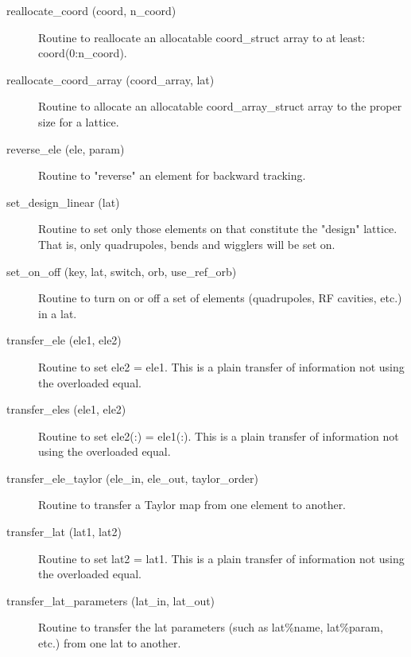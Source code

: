 \begin{description}
\label{r:reallocate.coord}
\item[reallocate_coord (coord, n_coord)] \Newline 
Routine to reallocate an allocatable  coord_struct array to at least:
coord(0:n_coord).

\label{r:reallocate.coord.array}
\item[reallocate_coord_array (coord_array, lat)] \Newline 
Routine to allocate an allocatable coord_array_struct array to
the proper size for a lattice.

\label{r:reverse.ele}
\item[reverse_ele (ele, param)] \Newline
Routine to "reverse" an element for backward tracking. 

\label{r:set.design.linear}
\item[set_design_linear (lat)] \Newline
Routine to set only those elements on that constitute the "design" 
lattice. That is, only quadrupoles, bends and wigglers will be set on. 

\label{r:set.on.off}
\item[set_on_off (key, lat, switch, orb, use_ref_orb)] \Newline
Routine to turn on or off a set of elements (quadrupoles,
RF cavities, etc.) in a lat.

\label{r:transfer.ele}
\item[transfer_ele (ele1, ele2)] \Newline 
     Routine to set ele2 = ele1. 
     This is a plain transfer of information not using the overloaded equal.

\label{r:transfer.eles}
\item[transfer_eles (ele1, ele2)] \Newline 
     Routine to set ele2(:) = ele1(:). 
     This is a plain transfer of information not using the overloaded equal.

\item[transfer_ele_taylor (ele_in, ele_out, taylor_order)] \Newline 
     Routine to transfer a Taylor map from one element to another.

\label{r:transfer.lat}
\item[transfer_lat (lat1, lat2)] \Newline 
     Routine to set lat2 = lat1. 
     This is a plain transfer of information not using the overloaded equal.

\label{r:transfer.lat.parameters}
\item[transfer_lat_parameters (lat_in, lat_out)] \Newline
Routine to transfer the lat parameters (such as lat\%name, 
lat\%param, etc.) from one lat to another. 


\end{description}
